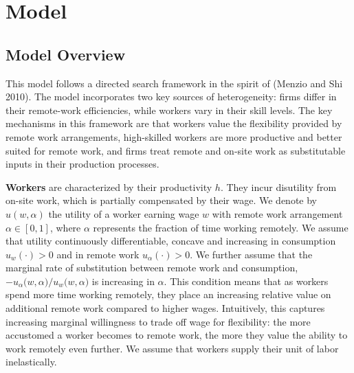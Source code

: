 \documentclass[
  11pt,
  letterpaper,
  DIV=11,
  numbers=noendperiod]{scrartcl}
\theoremstyle{plain}
\theoremstyle{remark}
\begin{document}
\section{Model}\label{model}

\subsection{Model Overview}\label{model-overview}

This model follows a directed search framework in the spirit of (Menzio
and Shi 2010). The model incorporates two key sources of heterogeneity:
firms differ in their remote-work efficiencies, while workers vary in
their skill levels. The key mechanisms in this framework are that
workers value the flexibility provided by remote work arrangements,
high-skilled workers are more productive and better suited for remote
work, and firms treat remote and on-site work as substitutable inputs in
their production processes.

\textbf{Workers} are characterized by their productivity \(h\). They
incur disutility from on-site work, which is partially compensated by
their wage. We denote by \(u(w,\alpha)\) the utility of a worker earning
wage \(w\) with remote work arrangement \(\alpha\in[0,1]\), where
\(\alpha\) represents the fraction of time working remotely. We assume
that utility continuously differentiable, concave and increasing in
consumption \(u_{w}(\cdot) > 0\) and in remote work
\(u_{\alpha}(\cdot) > 0\). We further assume that the marginal rate of
substitution between remote work and consumption,
\(-{u_\alpha\big(w,\alpha\big)}/{u_w\big(w,\alpha\big)}\) is increasing
in \(\alpha\). This condition means that as workers spend more time
working remotely, they place an increasing relative value on additional
remote work compared to higher wages. Intuitively, this captures
increasing marginal willingness to trade off wage for flexibility: the
more accustomed a worker becomes to remote work, the more they value the
ability to work remotely even further. We assume that workers supply
their unit of labor inelastically.
\end{document}
